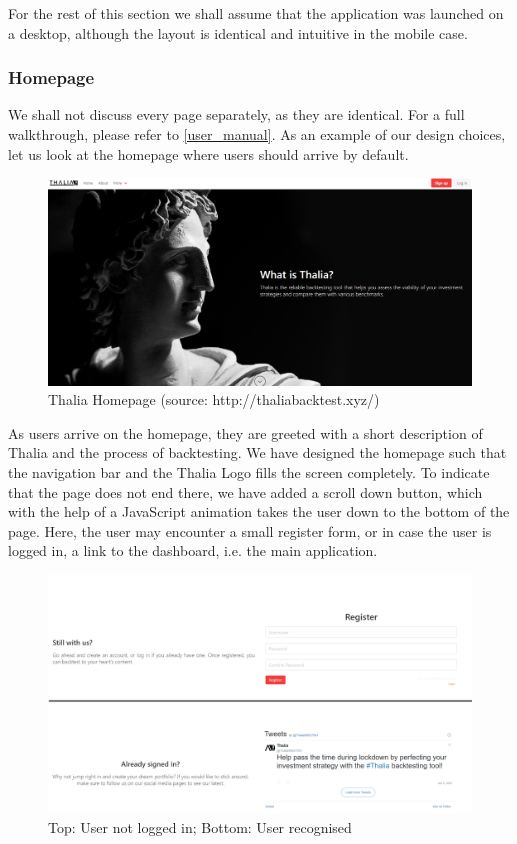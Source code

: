 \documentclass[main.tex]{subfiles}
\begin{document}
For the rest of this section we shall assume that the application was launched on a desktop, although the layout is identical and intuitive in the mobile case. 

\subsubsection*{Homepage}

We shall not discuss every page separately, as they are identical. For a full walkthrough, please refer to  \ref{user_manual}. As an example of our design choices, let us look at the homepage where users should arrive by default.

\begin{figure}[H]
   \centering
   \includegraphics[width=\textwidth]{08Appendices/081User/081Pictures/homepage.png}
   \caption{Thalia Homepage (source: http://thaliabacktest.xyz/)}
   \label{thalia_home_design}
\end{figure}

As users arrive on the homepage, they are greeted with a short description of Thalia and the process of backtesting. We have designed the homepage such that the navigation bar and the Thalia Logo fills the screen completely. To indicate that the page does not end there, we have added a scroll down button, which with the help of a JavaScript \cite{js} animation takes the user down to the bottom of the page. Here, the user may encounter a small register form, or in case the user is logged in, a link to the dashboard, i.e. the main application.

\begin{figure}[H]
   \centering
   \includegraphics[width=\textwidth]{08Appendices/081User/081Pictures/homepage_bottom.png}
   \caption{Top: User not logged in; Bottom: User recognised}
   \label{thalia_home_bottom_design}
\end{figure}
\end{document}
